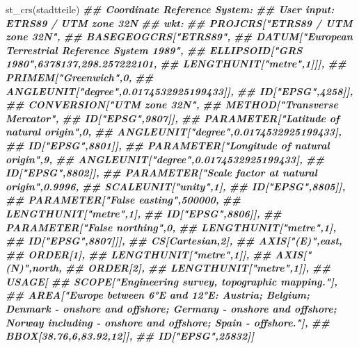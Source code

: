 \documentclass[11pt,german,a4paper]{article}
\newenvironment{Shaded}{\begin{snugshade}}{\end{snugshade}}
\newcommand{\DocumentationTok}[1]{\textcolor[rgb]{0.56,0.35,0.01}{\textbf{\textit{#1}}}}
\newcommand{\FunctionTok}[1]{\textcolor[rgb]{0.00,0.00,0.00}{#1}}
\newcommand{\NormalTok}[1]{#1}
\begin{document}
\begin{Shaded}
\begin{Highlighting}[]
\FunctionTok{st\_crs}\NormalTok{(stadtteile)}
\DocumentationTok{\#\# Coordinate Reference System:}
\DocumentationTok{\#\#   User input: ETRS89 / UTM zone 32N }
\DocumentationTok{\#\#   wkt:}
\DocumentationTok{\#\# PROJCRS["ETRS89 / UTM zone 32N",}
\DocumentationTok{\#\#     BASEGEOGCRS["ETRS89",}
\DocumentationTok{\#\#         DATUM["European Terrestrial Reference System 1989",}
\DocumentationTok{\#\#             ELLIPSOID["GRS 1980",6378137,298.257222101,}
\DocumentationTok{\#\#                 LENGTHUNIT["metre",1]]],}
\DocumentationTok{\#\#         PRIMEM["Greenwich",0,}
\DocumentationTok{\#\#             ANGLEUNIT["degree",0.0174532925199433]],}
\DocumentationTok{\#\#         ID["EPSG",4258]],}
\DocumentationTok{\#\#     CONVERSION["UTM zone 32N",}
\DocumentationTok{\#\#         METHOD["Transverse Mercator",}
\DocumentationTok{\#\#             ID["EPSG",9807]],}
\DocumentationTok{\#\#         PARAMETER["Latitude of natural origin",0,}
\DocumentationTok{\#\#             ANGLEUNIT["degree",0.0174532925199433],}
\DocumentationTok{\#\#             ID["EPSG",8801]],}
\DocumentationTok{\#\#         PARAMETER["Longitude of natural origin",9,}
\DocumentationTok{\#\#             ANGLEUNIT["degree",0.0174532925199433],}
\DocumentationTok{\#\#             ID["EPSG",8802]],}
\DocumentationTok{\#\#         PARAMETER["Scale factor at natural origin",0.9996,}
\DocumentationTok{\#\#             SCALEUNIT["unity",1],}
\DocumentationTok{\#\#             ID["EPSG",8805]],}
\DocumentationTok{\#\#         PARAMETER["False easting",500000,}
\DocumentationTok{\#\#             LENGTHUNIT["metre",1],}
\DocumentationTok{\#\#             ID["EPSG",8806]],}
\DocumentationTok{\#\#         PARAMETER["False northing",0,}
\DocumentationTok{\#\#             LENGTHUNIT["metre",1],}
\DocumentationTok{\#\#             ID["EPSG",8807]]],}
\DocumentationTok{\#\#     CS[Cartesian,2],}
\DocumentationTok{\#\#         AXIS["(E)",east,}
\DocumentationTok{\#\#             ORDER[1],}
\DocumentationTok{\#\#             LENGTHUNIT["metre",1]],}
\DocumentationTok{\#\#         AXIS["(N)",north,}
\DocumentationTok{\#\#             ORDER[2],}
\DocumentationTok{\#\#             LENGTHUNIT["metre",1]],}
\DocumentationTok{\#\#     USAGE[}
\DocumentationTok{\#\#         SCOPE["Engineering survey, topographic mapping."],}
\DocumentationTok{\#\#         AREA["Europe between 6°E and 12°E: Austria; Belgium; Denmark {-} onshore and offshore; Germany {-} onshore and offshore; Norway including {-} onshore and offshore; Spain {-} offshore."],}
\DocumentationTok{\#\#         BBOX[38.76,6,83.92,12]],}
\DocumentationTok{\#\#     ID["EPSG",25832]]}
\end{Highlighting}
\end{Shaded}
\end{document}
